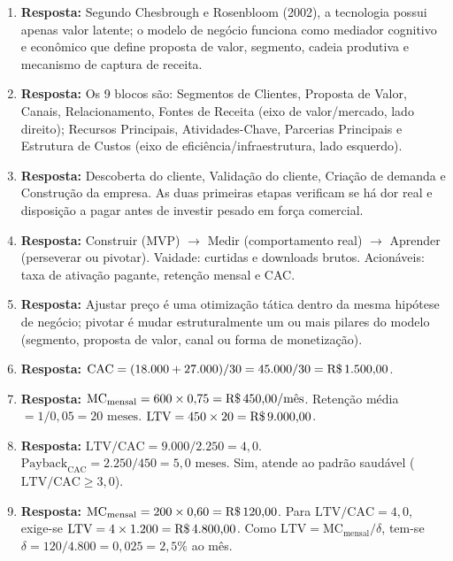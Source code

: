 \begin{boxGabarito}
  \begin{enumerate}[leftmargin=1.5em, itemsep=4pt]
    \item \textbf{Resposta:} Segundo Chesbrough e Rosenbloom (2002), a tecnologia possui apenas valor latente; o modelo de negócio funciona como mediador cognitivo e econômico que define proposta de valor, segmento, cadeia produtiva e mecanismo de captura de receita.
    \item \textbf{Resposta:} Os 9 blocos são: Segmentos de Clientes, Proposta de Valor, Canais, Relacionamento, Fontes de Receita (eixo de valor/mercado, lado direito); Recursos Principais, Atividades-Chave, Parcerias Principais e Estrutura de Custos (eixo de eficiência/infraestrutura, lado esquerdo).
    \item \textbf{Resposta:} Descoberta do cliente, Validação do cliente, Criação de demanda e Construção da empresa. As duas primeiras etapas verificam se há dor real e disposição a pagar antes de investir pesado em força comercial.
    \item \textbf{Resposta:} Construir (MVP) $\to$ Medir (comportamento real) $\to$ Aprender (perseverar ou pivotar). Vaidade: curtidas e downloads brutos. Acionáveis: taxa de ativação pagante, retenção mensal e CAC.
    \item \textbf{Resposta:} Ajustar preço é uma otimização tática dentro da mesma hipótese de negócio; pivotar é mudar estruturalmente um ou mais pilares do modelo (segmento, proposta de valor, canal ou forma de monetização).
    \item \textbf{Resposta:} $\text{CAC} = (18.000 + 27.000) / 30 = 45.000 / 30 = \text{R\$\,1.500,00}$.
    \item \textbf{Resposta:} $\text{MC}_{\text{mensal}} = 600 \times 0{,}75 = \text{R\$\,450,00/mês}$. Retenção média $= 1 / 0{,}05 = 20\text{ meses}$. $\text{LTV} = 450 \times 20 = \text{R\$\,9.000,00}$.
    \item \textbf{Resposta:} $\text{LTV/CAC} = 9.000 / 2.250 = 4{,}0$. $\text{Payback}_{\text{CAC}} = 2.250 / 450 = 5{,}0\text{ meses}$. Sim, atende ao padrão saudável ($\text{LTV/CAC} \ge 3{,}0$).
    \item \textbf{Resposta:} $\text{MC}_{\text{mensal}} = 200 \times 0{,}60 = \text{R\$\,120,00}$. Para $\text{LTV/CAC} = 4{,}0$, exige-se $\text{LTV} = 4 \times 1.200 = \text{R\$\,4.800,00}$. Como $\text{LTV} = \text{MC}_{\text{mensal}} / \delta$, tem-se $\delta = 120 / 4.800 = 0{,}025 = 2{,}5\%$ ao mês.

\end{enumerate}
\end{boxGabarito}
